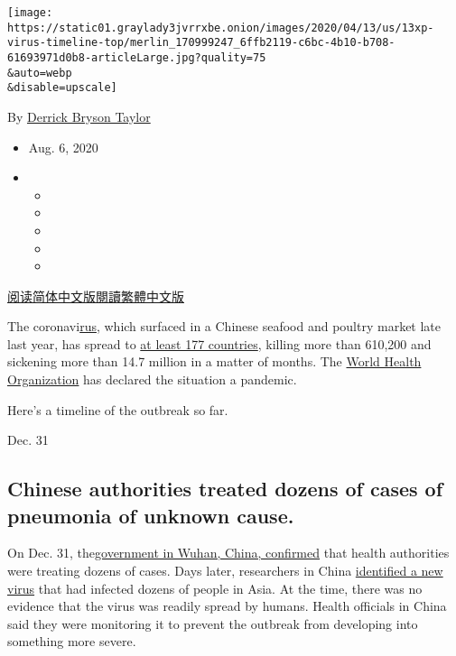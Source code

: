 \texttt{[image: https://static01.graylady3jvrrxbe.onion/images/2020/04/13/us/13xp-virus-timeline-top/merlin\_170999247\_6ffb2119-c6bc-4b10-b708-61693971d0b8-articleLarge.jpg?quality=75\\\&auto=webp\\\&disable=upscale]}

By
\href{https://www.nytimes3xbfgragh.onion/by/derrick-bryson-taylor}{Derrick
Bryson Taylor}

\begin{itemize}
\item
  Aug. 6, 2020
\item
  \begin{itemize}
  \item
  \item
  \item
  \item
  \item
  \end{itemize}
\end{itemize}

\href{https://cn.nytimes3xbfgragh.onion/china/20200214/coronavirus-timeline/}{阅读简体中文版}\href{https://cn.nytimes3xbfgragh.onion/china/20200214/coronavirus-timeline/zh-hant/}{閱讀繁體中文版}

The
coronavi\href{https://www.nytimes3xbfgragh.onion/2020/08/06/us/coronavirus-us.html}{rus},
which surfaced in a Chinese seafood and poultry market late last year,
has spread to
\href{https://www.nytimes3xbfgragh.onion/interactive/2020/world/coronavirus-maps.html}{at
least 177 countries}, killing more than 610,200 and sickening more than
14.7 million in a matter of months. The
\href{https://www.nytimes3xbfgragh.onion/2020/06/09/health/coronavirus-asymptomatic-world-health-organization.html}{World
Health Organization} has declared the situation a pandemic.

Here's a timeline of the outbreak so far.

Dec. 31

\hypertarget{chinese-authorities-treated-dozens-of-cases-of-pneumonia-of-unknown-cause}{%
\subsection{Chinese authorities treated dozens of cases of pneumonia of
unknown
cause.}\label{chinese-authorities-treated-dozens-of-cases-of-pneumonia-of-unknown-cause}}

On Dec. 31,
the\href{https://www.nytimes3xbfgragh.onion/2020/01/06/world/asia/china-SARS-pneumonialike.html}{government
in Wuhan, China, confirmed} that health authorities were treating dozens
of cases. Days later, researchers in China
\href{https://www.nytimes3xbfgragh.onion/2020/01/08/health/china-pneumonia-outbreak-virus.html}{identified
a new virus} that had infected dozens of people in Asia. At the time,
there was no evidence that the virus was readily spread by humans.
Health officials in China said they were monitoring it to prevent the
outbreak from developing into something more severe.


